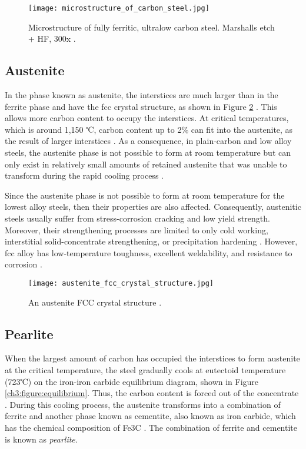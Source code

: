 \begin{figure}[H]
    \centering
    \texttt{[image: microstructure\_of\_carbon\_steel.jpg]}
    \caption{Microstructure of fully ferritic, ultralow carbon steel. Marshalls etch + HF, 300x \cite{molabe2018determining}.}
    \label{ch3:figure:microstructure}
\end{figure}

\subsection{Austenite} 
In the phase known as austenite, the interstices are much larger than in the ferrite phase and have the \acrshort{fcc} crystal structure, as shown in Figure \ref{ch3:figure:austenite} \cite{bajaj2020steels}. This allows more carbon content to occupy the interstices. At critical temperatures, which is around 1,150 ℃, carbon content up to 2\% can fit into the austenite, as the result of larger interstices \cite{bhadeshia2017steels}. As a consequence, in plain-carbon and low alloy steels, the austenite phase is not possible to form at room temperature but can only exist in relatively small amounts of retained austenite that was unable to transform during the rapid cooling process \cite{molabe2018determining}.

Since the austenite phase is not possible to form at room temperature for the lowest alloy steels, then their properties are also affected. Consequently, austenitic steels usually suffer from stress-corrosion cracking and low yield strength. Moreover, their strengthening processes are limited to only cold working, interstitial solid-concentrate strengthening, or precipitation hardening \cite{molabe2018determining}. However, \acrshort{fcc} alloy has low-temperature toughness, excellent weldability, and resistance to corrosion \cite{bhadeshia2017steels}.

 
\begin{figure}[H]
    \centering
    \texttt{[image: austenite\_fcc\_crystal\_structure.jpg]}
    \caption{An austenite FCC crystal structure \cite{bajaj2020steels}.}
    \label{ch3:figure:austenite}
\end{figure}

\subsection{Pearlite}
When the largest amount of carbon has occupied the interstices to form austenite at the critical temperature, the steel gradually cools at eutectoid temperature (723℃) on the iron-iron carbide equilibrium diagram, shown in Figure \ref{ch3:figure:equilibrium}. Thus, the carbon content is forced out of the concentrate  \cite{bhadeshia2017steels}. During this cooling process, the austenite transforms into a combination of ferrite and another phase known as cementite, also known as iron carbide, which has the chemical composition of Fe3C \cite{cmrp2014maintenance}. The combination of ferrite and cementite is known as \emph{pearlite}.

